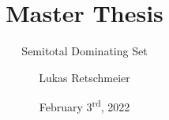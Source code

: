 \documentclass[
handout,
  english,            %
  aspectratio=169,    %
]{tum/tumbeamer}
\title{Master Thesis}
\subtitle{Semitotal Dominating Set}
\author{Lukas Retschmeier}
\institute{\theChairName\\\theDepartmentName\\\theUniversityName}
\date[03/02/2022]{February 3\textsuperscript{rd}, 2022}
\begin{document}
\newcommand{\dom}	{Dominating Set}
\newcommand{\tdom}{Total Doinating Set}
\newcommand{\sdom}{Semitotal Dominating Set}

\maketitle

\end{document}
